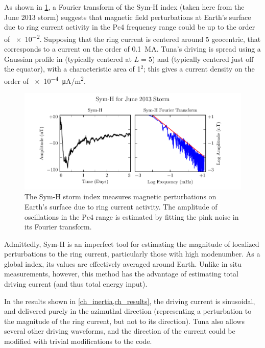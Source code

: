 As shown in \cref{fig_symh}, a Fourier transform of the Sym-H index (taken here
from the June 2013 storm) suggests that magnetic field perturbations at Earth's
surface due to ring current activity in the Pc4 frequency range could be up to
the order of \SI{e-2}{\nT}. Supposing that the ring current is centered around
\SI{5}{\RE} geocentric, that corresponds to a current on the order of
\SI{0.1}{\mega\ampere}. Tuna's driving is spread using a Gaussian profile in
\lysakx (typically centered at $L=5$) and \lysakz (typically centered just off
the equator), with a characteristic area of \SI{1}{\RE}$^2$; this gives a
current density on the order of \SI{e-4}{\uA/\meter\squared}. 

\begin{figure}[!htb]
  \centering
  \includegraphics[width=\textwidth]{figures/symh.pdf}
  \caption[Sym-H for June 2013 Storm]{
    The Sym-H storm index\cite{nasa_cdaweb} measures magnetic perturbations on
    Earth's surface due to ring current activity. The amplitude of oscillations
    in the Pc4 range is estimated by fitting the pink noise in its Fourier
    transform. 
  }
  \label{fig_symh}
\end{figure}

Admittedly, Sym-H is an imperfect tool for estimating the magnitude of
localized perturbations to the ring current, particularly those with high
modenumber. As a global index, its values are effectively averaged around
Earth. Unlike in situ measurements, however, this method has the advantage of
estimating total driving current (and thus total energy input). 

In the results shown in \cref{ch_inertia,ch_results}, the driving current is
sinusoidal, and delivered purely in the azimuthal direction (representing a
perturbation to the magnitude of the ring current, but not to its direction).
Tuna also allows several other driving waveforms, and the direction of the
current could be modified with trivial modifications to the code. 

